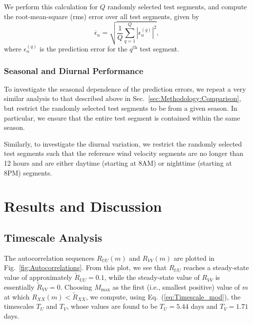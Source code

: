 \documentclass[11pt, oneside]{article}
\newcommand{\figref}[1]{Fig.~\ref{#1}}
\newcommand{\eqnref}[1]{Eq.~(\ref{#1})}
\newcommand{\secref}[1]{Sec.~\ref{#1}}
\begin{document}
We perform this calculation for $Q$ randomly selected test segments, and compute the root-mean-square (rms) error over all test segments, given by
\begin{equation}\label{eq:RMSError}
\overline{\epsilon}_n = \sqrt{ \frac{1}{Q} \sum_{q = 1}^Q \left| \epsilon_n^{(q)} \right|^2 },
\end{equation}
where $\epsilon_n^{(q)}$ is the prediction error for the $q^\text{th}$ test segment.

\subsubsection{Seasonal and Diurnal Performance}\label{sec:Methodology:SeasonalAndDiurnalDependence}
To investigate the seasonal dependence of the prediction errors, we repeat a very similar analysis to that described above in \secref{sec:Methodology:Comparison}, but restrict the randomly selected test segments to be from a given season.
In particular, we ensure that the entire test segment is contained within the same season.

Similarly, to investigate the diurnal variation, we restrict the randomly selected test segments such that the reference wind velocity segments are no longer than 12 hours and are either daytime (starting at 8AM) or nighttime (starting at 8PM) segments.

\section{Results and Discussion}\label{sec:Results}

\subsection{Timescale Analysis}\label{sec:Results:Timescale}
The autocorrelation sequences $R_{UU}(m)$ and $R_{VV}(m)$ are plotted in \figref{fig:Autocorrelations}.
From this plot, we see that $R_{UU}$ reaches a steady-state value of approximately $\tilde{R}_{UU} = 0.1$, while the steady-state value of $R_{VV}$ is essentially $\tilde{R}_{VV} = 0$.
Choosing $M_\text{max}$ as the first (i.e., smallest positive) value of $m$ at which $R_{XX}(m) < \tilde{R}_{XX}$, we compute, using \eqnref{eq:Timescale_mod}, the timescales $T_U$ and $T_V$,
whose values are found to be $T_U = 5.44$ days and $T_V = 1.71$ days.
\end{document}
